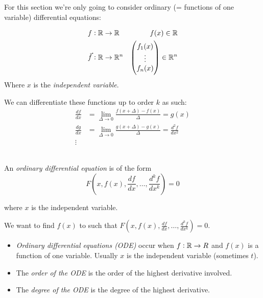 \documentclass[10pt]{scrartcl}
\begin{document}
\TableofContents

\setcounter{page}{3}


\vspace*{5pt}


For 
this section we're only going to consider ordinary (= functions of one variable) differential equations:

\begin{align*}
&f: \mathbb{R} \to \mathbb{R} & f(x) \in \mathbb{R}\\
&\vec{f}: \mathbb{R} \to \mathbb{R}^n & \begin{pmatrix}f_1(x)\\\vdots\\f_n(x)\end{pmatrix} \in \mathbb{R}^n
\end{align*}
Where $x$ is the \emph{independent variable}. 

We can differentiate these functions up to order $k$ as such:
\[
\begin{aligned}
  \frac{df}{dx} &= \lim_{\Delta \to 0} \frac{f(x + \Delta) - f(x)}{\Delta} = g(x)\\[0.2cm]
  \frac{dg}{dx} &= \lim_{\Delta \to 0} \frac{g(x + \Delta) - g(x)}{\Delta} = \frac{d^2f}{dx^2}\\
  \vdots
\end{aligned}
\]~


\begin{definition}
An \emph{ordinary differential equation} is of the form
\[F\left(x,f(x),\frac{df}{dx},\dots,\frac{d^kf}{dx^k}\right) = 0\]

where $x$ is the independent variable.
\end{definition}
We want to find $f(x)$ to such that $F\left(x,f(x),\frac{df}{dx},\dots,\frac{d^kf}{dx^k}\right) = 0$.


\begin{itemize}
\item \emph{Ordinary differential equations (ODE)} occur when $f: \mathbb{R} \to R$ and $f(x)$ is a function of one variable. Usually $x$ is the independent variable (sometimes $t$). 

\item The \emph{order of the ODE} is the order of the highest derivative involved. 
\item The \emph{degree of the ODE} is the degree of the highest derivative.
\end{itemize}
\end{document}
